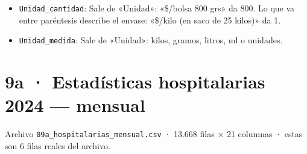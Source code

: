 \documentclass[10pt]{article}
\begin{document}
\begin{alertabox}
\begin{itemize}[leftmargin=1.4em,itemsep=2pt,topsep=2pt]
\item \texttt{Unidad\_\allowbreak{}cantidad}: Sale de «Unidad»: «\$/bolsa 800 grs» da 800. Lo que va entre paréntesis describe el envase: «\$/kilo (en saco de 25 kilos)» da 1.
\item \texttt{Unidad\_\allowbreak{}medida}: Sale de «Unidad»: kilos, gramos, litros, ml o unidades.
\end{itemize}
\end{alertabox}

\clearpage
\hypertarget{base9a}{}
\section{9a · Estadísticas hospitalarias 2024 — mensual}
\small Archivo \texttt{09a\_hospitalarias\_mensual.csv} · 13.668 filas × 21 columnas · estas son 6 filas reales del archivo.\normalsize
\end{document}
